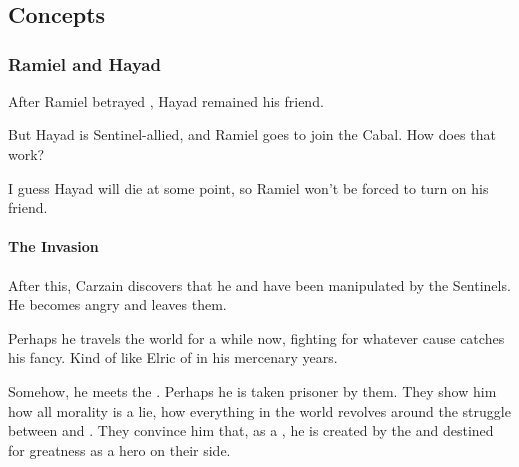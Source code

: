 \chapter{\RamielsAwakeningBook}















\section{Concepts}









\subsection{Ramiel and Hayad}
After Ramiel betrayed \Belzir, Hayad remained his friend. 

But Hayad is Sentinel-allied, and Ramiel goes to join the Cabal. 
How does that work? 

I guess Hayad will die at some point, so Ramiel won't be forced to turn on his friend. 







\subsubsection{The \Bane{} Invasion}

After this, Carzain discovers that he and \Belzir{} have been manipulated by the Sentinels. He becomes angry and leaves them. 

Perhaps he travels the world for a while now, fighting for whatever cause catches his fancy. Kind of like Elric of \Melnibone{} in his mercenary years. 

Somehow, he meets the \banes. Perhaps he is taken prisoner by them. They show him how all morality is a lie, how everything in the world revolves around the struggle between \dragons{} and \banes. They convince him that, as a \Malach, he is created by the \banes{} and destined for greatness as a hero on their side. 

